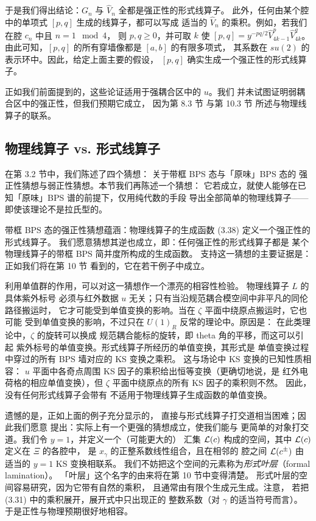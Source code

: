 于是我们得出结论：$G_n$ 与 $\hat V_n$ 全都是强正性的形式线算子。
此外，任何由某个腔中的单项式 $[p,q]$ 生成的线算子，都可以写成
适当的 $\hat V_n$ 的乘积。例如，若我们在腔 $c_n$ 中且 $n=1 \mod 4$，
则 $p,q\geq 0$，并可取 $k$ 使 $[p,q] = y^{-pq/2} \hat V_{4k-1}^p \hat V_{4k}^q$。
由此可知，$[p,q]$ 的所有穿墙像都是 $[a,b]$ 的有限多项式，
其系数在 $su(2)$ 的表示环中。因此，给定上面主要的假设，
$[p,q]$ 确实生成一个强正性的形式线算子。

正如我们前面提到的，这些论证适用于强耦合区中的 $u$。我们
并未试图证明弱耦合区中的强正性，但我们预期它成立，
因为第 8.3 节%
与第 10.3 节%
所述与物理线算子的联系。



\subsection{物理线算子 vs. 形式线算子}
\label{subsec:Physics-Formal}

在第 3.2 节中，我们陈述了四个猜想：%
关于带框 BPS 态与「原味」BPS 态的
强正性猜想与弱正性猜想。本节我们再陈述一个猜想：
它若成立，就使人能够在已知「原味」BPS 谱的前提下，仅用纯代数的手段
导出全部简单的物理线算子——即使该理论不是拉氏型的。

带框 BPS 态的强正性猜想蕴涵：物理线算子的生成函数 (3.38) 定义一个强正性的形式线算子。%
我们愿意猜想其逆也成立，即：任何强正性的形式线算子都是
某个物理线算子的带框 BPS 简并度所构成的生成函数。
支持这一猜想的主要证据是：正如我们将在第 10 节%
看到的，它在若干例子中成立。

利用单值群的作用，可以对这一猜想作一个漂亮的相容性检验。
物理线算子 $L$ 的具体紫外标号
必须与红外数据 $u$ 无关；只有当沿规范耦合模空间中非平凡的同伦路径搬运时，
它才可能受到单值变换的影响。当在 $\zeta$ 平面中绕原点搬运时，它也可能
受到单值变换的影响，不过只在 $U(1)_R$ 反常的理论中。原因是：
在此类理论中，$\zeta$ 的旋转可以换成
规范耦合能标的旋转，即 theta 角的平移，而这可以引起
紫外标号的单值变换。形式线算子所经历的单值变换，其形式是
单值变换过程中穿过的所有 BPS 墙对应的 KS 变换之乘积。
这与场论中 KS 变换的已知性质相容\cite{Gaiotto:2008cd}：
$u$ 平面中各奇点周围 KS 因子的乘积给出恒等变换（更确切地说，是
红外电荷格的相应单值变换），但
$\zeta$ 平面中绕原点的所有 KS 因子的乘积则不然。
因此，没有任何形式线算子会带有
不适用于物理线算子生成函数的单值变换。

遗憾的是，正如上面的例子充分显示的，
直接与形式线算子打交道相当困难；因此我们愿意
提出：实际上有一个更强的猜想成立，使我们能与
更简单的对象打交道。我们令 $y=1$，并定义一个（可能更大的）
汇集 $\mathcal{L}(c)$ 构成的空间，其中 $\mathcal{L}(c)$ 定义在 $\Xi$ 的各腔中，
是 $x_\gamma$ 的正整系数线性组合，且在相邻的
腔之间 $\mathcal{L}(c^\pm)$ 由适当的 $y=1$ KS 变换相联系。
我们不妨把这个空间的元素称为\emph{形式叶层}（formal lamination）。
「叶层」这个名字的由来将在第 10 节中变得清楚。%
形式叶层的空间容易研究，因为它带有自然的乘积，
且通常由有限个生成元生成。注意，
若把 (3.31) 中的乘积展开，展开式中只出现正的%
整数系数（对 $\gamma$ 的适当符号而言）。
于是正性与物理预期很好地相容。

